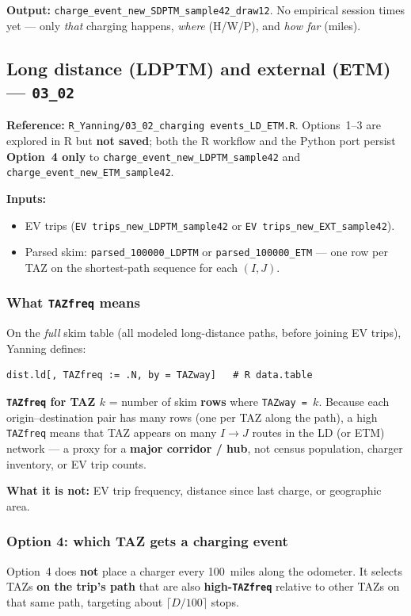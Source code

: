 \documentclass[11pt,a4paper]{article}
\begin{document}
\textbf{Output:} \texttt{charge\_event\_new\_SDPTM\_sample42\_draw12}. No empirical session times yet --- only \emph{that} charging happens, \emph{where} (H/W/P), and \emph{how far} (miles).

\subsection{Long distance (LDPTM) and external (ETM) --- \texttt{03\_02}}
\textbf{Reference:} \texttt{R\_Yanning/03\_02\_charging events\_LD\_ETM.R}. Options~1--3 are explored in R but \textbf{not saved}; both the R workflow and the Python port persist \textbf{Option~4 only} to \texttt{charge\_event\_new\_LDPTM\_sample42} and \texttt{charge\_event\_new\_ETM\_sample42}.

\textbf{Inputs:}
\begin{itemize}[noitemsep]
  \item EV trips (\texttt{EV trips\_new\_LDPTM\_sample42} or \texttt{EV trips\_new\_EXT\_sample42}).
  \item Parsed skim: \texttt{parsed\_100000\_LDPTM} or \texttt{parsed\_100000\_ETM} --- one row per TAZ on the shortest-path sequence for each $(I,J)$.
\end{itemize}

\subsubsection{What \texttt{TAZfreq} means}
On the \emph{full} skim table (all modeled long-distance paths, before joining EV trips), Yanning defines:
\begin{lstlisting}
dist.ld[, TAZfreq := .N, by = TAZway]   # R data.table
\end{lstlisting}
\textbf{\texttt{TAZfreq} for TAZ $k$} = number of skim \textbf{rows} where \texttt{TAZway = $k$}. Because each origin--destination pair has many rows (one per TAZ along the path), a high \texttt{TAZfreq} means that TAZ appears on many $I \to J$ routes in the LD (or ETM) network --- a proxy for a \textbf{major corridor / hub}, not census population, charger inventory, or EV trip counts.

\textbf{What it is not:} EV trip frequency, distance since last charge, or geographic area.

\subsubsection{Option 4: which TAZ gets a charging event}
Option~4 does \textbf{not} place a charger every 100~miles along the odometer. It selects TAZs \textbf{on the trip's path} that are also \textbf{high-\texttt{TAZfreq}} relative to other TAZs on that same path, targeting about $\lceil D/100 \rceil$ stops.
\end{document}
